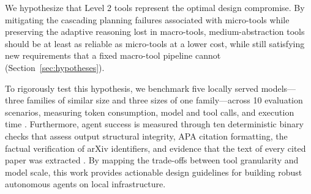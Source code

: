 We hypothesize that Level 2 tools represent the optimal design compromise. By mitigating the cascading planning failures associated with micro-tools while preserving the adaptive reasoning lost in macro-tools, medium-abstraction tools should be at least as reliable as micro-tools at a lower cost, while still satisfying new requirements that a fixed macro-tool pipeline cannot (Section~\ref{sec:hypotheses}). 

To rigorously test this hypothesis, we benchmark five locally served models---three families of similar size and three sizes of one family---across 10 evaluation scenarios, measuring token consumption, model and tool calls, and execution time \cite{patil2025bfcl}. Furthermore, agent success is measured through ten deterministic binary checks that assess output structural integrity, APA citation formatting, the factual verification of arXiv identifiers, and evidence that the text of every cited paper was extracted \cite{liu2024agentbench, yao2024taubench}. By mapping the trade-offs between tool granularity and model scale, this work provides actionable design guidelines for building robust autonomous agents on local infrastructure.